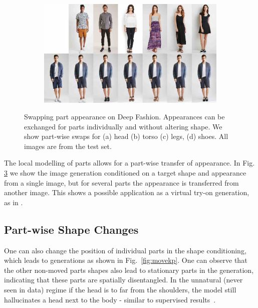 \begin{figure}[htp]
\begin{subfigure}{0.49\linewidth}
		\label{fig:part3_21}
		\end{subfigure}
		\begin{subfigure}{0.49\linewidth}
		\centering
		\includegraphics[trim={0cm 0cm 0cm 0cm},clip, width=1.\linewidth]{fig/factor/part6_30}\caption{}
		\label{fig:part3_30}
		\end{subfigure}
		\caption{Swapping part appearance on Deep Fashion. Appearances can be exchanged for parts individually and without altering shape. We show part-wise swaps for (a) head (b) torso (c) legs, (d) shoes. All images are from the test set.}
		\label{fig:partswaps}
	\end{figure}

	The local modelling of parts allows for a part-wise transfer of appearance. In Fig. \ref{fig:partswaps} we show the image generation conditioned on a target shape and appearance from a single image, but for several parts the appearance is transferred from another image. This shows a possible application as a virtual try-on generation, as in \cite{han17viton}.

	\subsection{Part-wise Shape Changes}\label{sec:partshape}
	One can also change the position of individual parts in the shape conditioning, which leads to generations as shown in Fig.~\ref{fig:movekp}. One can observe that the other non-moved parts shapes also lead to stationary parts in the generation, indicating that these parts are spatially disentangled. In the unnatural (never seen in data) regime \eg if the head is to far from the shoulders, the model still hallucinates a head next to the body - similar to supervised results~\cite{debem18dgpose}.

